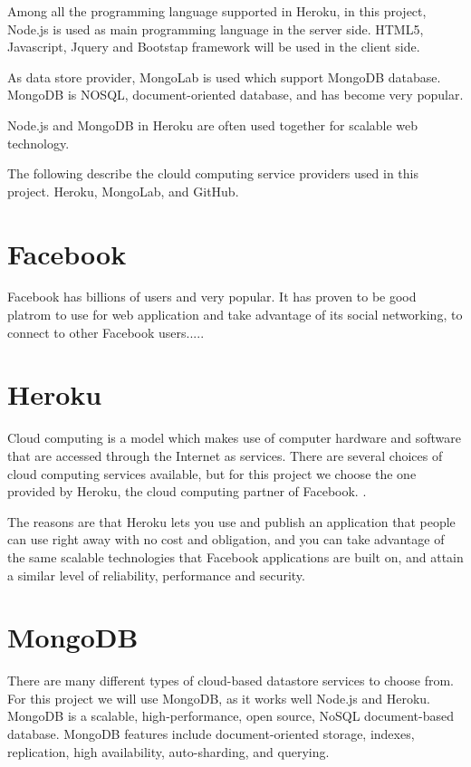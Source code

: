 Among all the programming language supported in Heroku, in this project, Node.js is used as main programming language in the server side. HTML5, Javascript, Jquery and Bootstap framework will be used in the client side. 

As data store provider, MongoLab is used which support MongoDB database. MongoDB is NOSQL, document-oriented database, and has become very popular.   

Node.js and MongoDB in Heroku are often used together for scalable web technology.       

The following describe the clould computing service providers used in this project. Heroku, MongoLab, and GitHub.

\section{Facebook}
Facebook has billions of users and very popular. It has proven to be good platrom to use for web application and take advantage of its social networking, to connect to other Facebook users..... 

\section{Heroku}
Cloud computing is a model which makes use of computer hardware and software that are accessed through the Internet as services. There are several choices of cloud computing services available, but for this project we choose the one provided by Heroku, the cloud computing partner of Facebook. \cite{Heroku}.

The reasons are that Heroku lets you use and publish an application that people can use right away with no cost and obligation, and you can take advantage of the same scalable technologies that Facebook applications are built on, and attain a similar level of reliability, performance and security. 

\section{MongoDB}
There are many different types of cloud-based datastore services to choose from. For this project we will use MongoDB, as it works well Node.js and Heroku. MongoDB is a scalable, high-performance, open source, NoSQL document-based database. MongoDB features include document-oriented storage, indexes, replication, high availability, auto-sharding, and querying.

